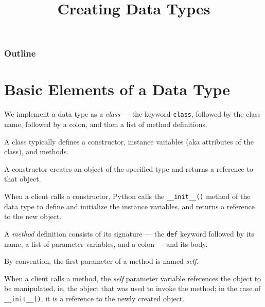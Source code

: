 \documentclass[8pt,a4paper,compress,handout]{beamer}
\title{Creating Data Types}
\date{}
\begin{document}
\begin{frame}
\vfill
\titlepage
\end{frame}

\begin{frame}
\frametitle{Outline}
\tableofcontents
\end{frame}

\section{Basic Elements of a Data Type}
\begin{frame}[fragile]
We implement a data type as a \emph{class} --- the keyword \lstinline{class}, followed by the class name, followed by a colon, and then a list of method definitions.

\bigskip

A class typically defines a constructor, instance variables (aka attributes of the class), and methods.

\bigskip

A constructor creates an object of the specified type and returns a reference to that object.

\bigskip

When a client calls a constructor, Python calls the \lstinline{__init__()} method of the data type to define and initialize the instance variables, and returns a reference to the new object. 

\bigskip

A \emph{method} definition consists of its signature --- the \lstinline{def} keyword followed by its name, a list of parameter variables, and a colon --- and its body.

\bigskip

By convention, the first parameter of a method is named \emph{self}.

\bigskip

When a client calls a method, the \emph{self} parameter variable references the object to be manipulated, ie, the object that was used to invoke the method; in the case of \lstinline{__init__()}, it is a reference to the newly created object.
\end{frame}
\end{document}
